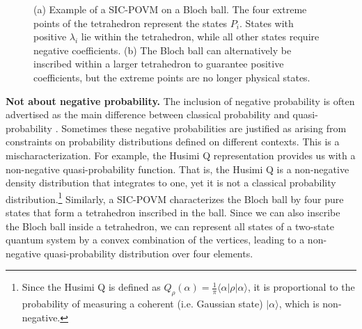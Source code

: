 \documentclass[10pt,twocolumn, nofootinbib]{revtex4-2}
\begin{document}
\begin{figure}[H]
\begin{subfigure}[c]{0.23\textwidth}
		\caption{}
	\end{subfigure}
	\caption{(a) Example of a SIC-POVM on a Bloch ball. The four extreme points of the tetrahedron represent the states $P_i$. States with positive $\lambda_i$ lie within the tetrahedron, while all other states require negative coefficients. (b) The Bloch ball can alternatively be inscribed within a larger tetrahedron to guarantee positive coefficients, but the extreme points are no longer physical states.}
\end{figure}


\textbf{Not about negative probability.} The inclusion of negative probability is often advertised as the main difference between classical probability and quasi-probability \cite{adhikary2020}. Sometimes these negative probabilities are justified as arising from constraints on probability distributions defined on different contexts. This is a mischaracterization. For example, the Husimi Q representation provides us with a non-negative quasi-probability function. That is, the Husimi Q is a non-negative density distribution that integrates to one, yet it is not a classical probability distribution.\footnote{Since the Husimi Q is defined as $Q_{\rho} ( \alpha ) = \frac{1}{\pi} \langle \alpha | \rho | \alpha \rangle$, it is proportional to the probability of measuring a coherent (i.e. Gaussian state) $| \alpha \rangle$, which is non-negative. } Similarly, a SIC-POVM characterizes the Bloch ball by four pure states that form a tetrahedron inscribed in the ball. Since we can also inscribe the Bloch ball inside a tetrahedron, we can represent all states of a two-state quantum system by a convex combination of the vertices, leading to a non-negative quasi-probability distribution over four elements.
\end{document}

